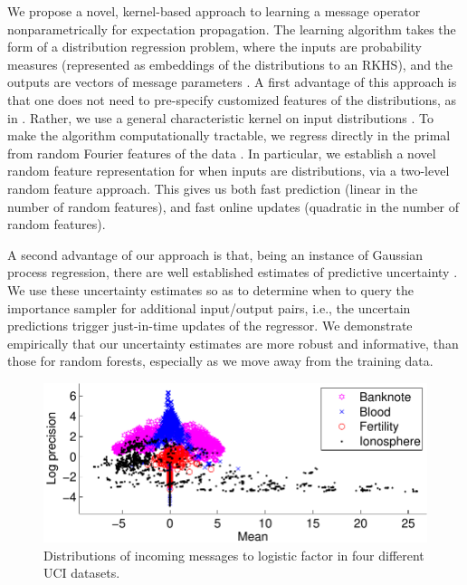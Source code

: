 \documentclass[english]{article}
\theoremstyle{plain}
\theoremstyle{plain}
\newcommand{\wjnote}[1]{ }
\newcommand{\aenote}[1]{}
\begin{document}
We propose a novel, kernel-based approach to learning a message operator nonparametrically
for expectation propagation. The learning algorithm takes the form of a distribution regression
problem, where the inputs are probability measures (represented as embeddings of the distributions to an RKHS), and the outputs are vectors of message
parameters \citep{Szabo2014}. 
A first advantage of this approach is that one does not need to pre-specify customized features
of the distributions, as in \citep{Eslami2014,Heess2013}. Rather, 
we use a general characteristic kernel on input distributions 
\citep[eq. 9]{Christmann2010}.
%
%
To make the algorithm computationally tractable, 
we regress  directly in the primal from random Fourier features of the data \citep{Rahimi2007,Le2013,YanSmoZonWil14}.
In particular, we establish a novel random feature representation for when
 inputs are distributions, via a  two-level random feature approach.
This gives us both fast prediction (linear in the number of
random features), and fast online updates (quadratic in the number of random features).

A second advantage of our approach is that, being an instance of Gaussian process
regression, there are well established estimates of predictive uncertainty \citep[Ch. 2]{RasWil06}.
We use these uncertainty estimates so as to determine when to query the importance sampler
for additional input/output pairs, i.e., the uncertain predictions trigger just-in-time updates
of the regressor. We demonstrate empirically that our uncertainty estimates are 
more robust and informative,
than those for random forests, especially as we move away from the training data.

\begin{figure}[t]
\centering
\includegraphics[width=0.9\columnwidth]{img/online/uci_in_msgs-crop}
\caption{Distributions of incoming messages to logistic factor in four different UCI datasets. 
\label{fig:uci_in_msgs}
}
\end{figure}
\end{document}
